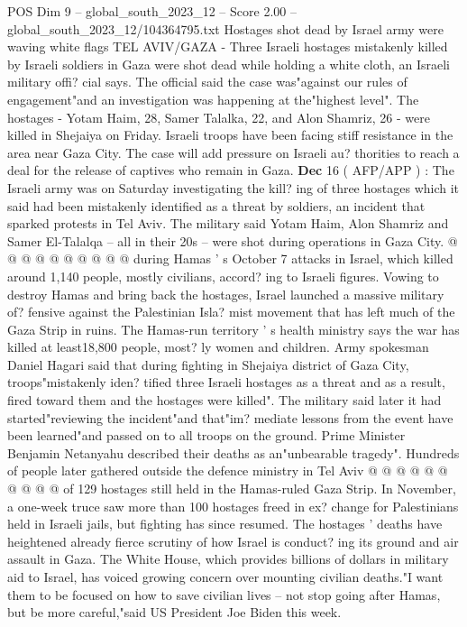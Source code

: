 \begin{textsample}{POS Dim 9 – global\_south\_2023\_12 – Score 2.00 – global\_south\_2023\_12/104364795.txt}  \label{ex:f9_pos_016}
Hostages shot dead by Israel army were waving white flags TEL AVIV/GAZA - Three Israeli hostages mistakenly killed by Israeli soldiers in Gaza were shot dead while holding a white cloth, an Israeli military offi? cial says.
The official said the case was"against our rules of engagement"and an investigation was happening at the"highest level".
The hostages - Yotam Haim, 28, Samer Talalka, 22, and Alon Shamriz, 26 - were killed in Shejaiya on Friday.
Israeli troops have been facing stiff resistance in the area near Gaza City.
The case will add pressure on Israeli au? thorities to reach a deal for the release of captives who remain in Gaza. \textbf{Dec} 16 ( AFP/APP ) : The Israeli army was on Saturday investigating the kill? ing of three hostages which it said had been mistakenly identified as a threat by soldiers, an incident that sparked protests in Tel Aviv.
The military said Yotam Haim, Alon Shamriz and Samer El-Talalqa -- all in their 20s -- were shot during operations in Gaza City. @ @ @ @ @ @ @ @ @ @ during Hamas ' s October 7 attacks in Israel, which killed around 1,140 people, mostly civilians, accord? ing to Israeli figures.
Vowing to destroy Hamas and bring back the hostages, Israel launched a massive military of? fensive against the Palestinian Isla? mist movement that has left much of the Gaza Strip in ruins.
The Hamas-run territory ' s health ministry says the war has killed at least18,800 people, most? ly women and children.
Army spokesman Daniel Hagari said that during fighting in Shejaiya district of Gaza City, troops"mistakenly iden? tified three Israeli hostages as a threat and as a result, fired toward them and the hostages were killed".
The military said later it had started"reviewing the incident"and that"im? mediate lessons from the event have been learned"and passed on to all troops on the ground.
Prime Minister Benjamin Netanyahu described their deaths as an"unbearable tragedy".
Hundreds of people later gathered outside the defence ministry in Tel Aviv @ @ @ @ @ @ @ @ @ @ of 129 hostages still held in the Hamas-ruled Gaza Strip.
In November, a one-week truce saw more than 100 hostages freed in ex? change for Palestinians held in Israeli jails, but fighting has since resumed.
The hostages ' deaths have heightened already fierce scrutiny of how Israel is conduct? ing its ground and air assault in Gaza.
The White House, which provides billions of dollars in military aid to Israel, has voiced growing concern over mounting civilian deaths."I want them to be focused on how to save civilian lives -- not stop going after Hamas, but be more careful,"said US President Joe Biden this week.

\end{textsample}
